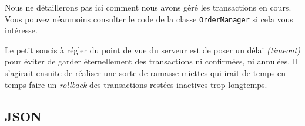 Nous ne détaillerons pas ici comment nous avons géré les transactions en cours. Vous pouvez néanmoins
consulter le code de la classe \verb|OrderManager| si cela vous intéresse.

Le petit soucis à régler du point de vue du serveur est de poser un délai \emph{(timeout)} pour éviter
de garder éternellement des transactions ni confirmées, ni annulées. Il s'agirait ensuite
de réaliser une sorte de ramasse-miettes qui irait de temps en temps faire un \emph{rollback} des transactions
restées inactives trop longtemps.

\subsection{JSON}

